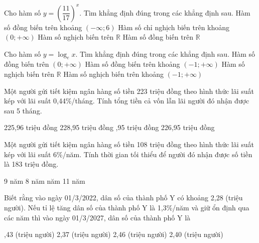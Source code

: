 \documentclass[12pt,a4paper]{article}
\begin{document}
\begin{ex}
 Cho hàm số $y=\left(\dfrac{11}{17}\right)^x$. Tìm khẳng định đúng trong các khẳng định sau.
\choice
{ Hàm số đồng biến trên khoảng $(-\infty; 6)$ }
   { Hàm số chỉ nghịch biến trên khoảng $(0; +\infty)$ }
     { \True Hàm số nghịch biến trên ${ \mathbb{R} }$ }
    { Hàm số đồng biến trên ${\mathbb{R} }$ }
\end{ex}

\begin{ex}
 Cho hàm số $y=\log_{e} x$. Tìm khẳng định đúng trong các khẳng định sau.
\choice
{ \True Hàm số đồng biến trên $(0; +\infty)$ }
   { Hàm số đồng biến trên khoảng $(-1;+\infty)$ }
     { Hàm số nghịch biến trên ${\mathbb{R} }$ }
    { Hàm số nghịch biến trên khoảng $(-1;+\infty)$ }
\end{ex}

\begin{ex}
 Một người gửi tiết kiệm ngân hàng số tiền 223 triệu đồng theo hình thức lãi suất kép với lãi suất 0,44\%/tháng. Tính tổng tiền cả vốn lẫn lãi người đó nhận được sau 5 tháng.
 
\choice
{ 225,96 triệu đồng }
   { 228,95 triệu đồng }
     { ,95 triệu đồng }
    { 226,95 triệu đồng }
\end{ex}

\begin{ex}
 Một người gửi tiết kiệm ngân hàng số tiền 108 triệu đồng theo hình thức lãi suất kép với lãi suất 6\%/năm. Tính thời gian tối thiểu để người đó nhận được số tiền là 183 triệu đồng.
 
\choice
{ 9 năm }
   { 8 năm }
     {  năm }
    { 11 năm }
\end{ex}

\begin{ex}
 Biết rằng vào ngày 01/3/2022, dân số của thành phố Y có khoảng 2,28 (triệu người). Nếu tỉ lệ tăng dân số của thành phố Y là 1,3\%/năm và giữ ổn định qua các năm thì vào ngày 01/3/2027, dân số của thành phố Y là
 
\choice
{ ,43 (triệu người) }
   { 2,37 (triệu người) }
     { 2,46 (triệu người) }
    { 2,40 (triệu người) }
\end{ex}
\end{document}
